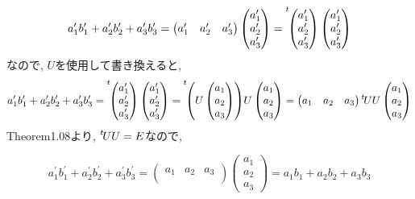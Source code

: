 \documentclass{jsarticle}
\newcommand*{\transp}[1]{\prescript{t\!}{}{#1}}
\begin{document}
\begin{equation}
  a^\prime_1 b^\prime_1 + a^\prime_2 b^\prime_2 + a^\prime_3 b^\prime_3
  = 
  \begin{pmatrix}
    a^\prime_1 & a^\prime_2 & a^\prime_3 
  \end{pmatrix}
  \begin{pmatrix}
    a^\prime_1 \\
    a^\prime_2 \\
    a^\prime_3
  \end{pmatrix}
  = \transp{ 
      \begin{pmatrix}
        a^\prime_1 \\
        a^\prime_2 \\
        a^\prime_3
      \end{pmatrix}
    }
  \begin{pmatrix}
    a^\prime_1 \\
    a^\prime_2 \\
    a^\prime_3
  \end{pmatrix}
\end{equation}
なので, $U$を使用して書き換えると, 
\begin{equation}
  a^\prime_1 b^\prime_1 + a^\prime_2 b^\prime_2 + a^\prime_3 b^\prime_3
  = \transp{ 
      \begin{pmatrix}
        a^\prime_1 \\
        a^\prime_2 \\
        a^\prime_3
      \end{pmatrix}
    }
  \begin{pmatrix}
    a^\prime_1 \\
    a^\prime_2 \\
    a^\prime_3
  \end{pmatrix}
  = \transp{
      \left(
      U
      \begin{pmatrix}
        a_1 \\
        a_2 \\
        a_3
      \end{pmatrix}
      \right)
    }
    U
  \begin{pmatrix}
    a_1 \\
    a_2 \\
    a_3
  \end{pmatrix}
  =
  \begin{pmatrix}
    a_1 & a_2 & a_3 \\
  \end{pmatrix}
  \transp{U}
  U
  \begin{pmatrix}
    a_1 \\
    a_2 \\
    a_3
  \end{pmatrix}
\end{equation}
Theorem1.08より, $\transp{U} U = E$なので, 

\begin{equation}
  a^\prime_1 b^\prime_1 + a^\prime_2 b^\prime_2 + a^\prime_3 b^\prime_3
  =
  \begin{pmatrix}
    a_1 & a_2 & a_3 \\
  \end{pmatrix}
  \begin{pmatrix}
    a_1 \\
    a_2 \\
    a_3
  \end{pmatrix}
  =
  a_1 b_1 + a_2 b_2 + a_3 b_3
\end{equation}
\end{document}
